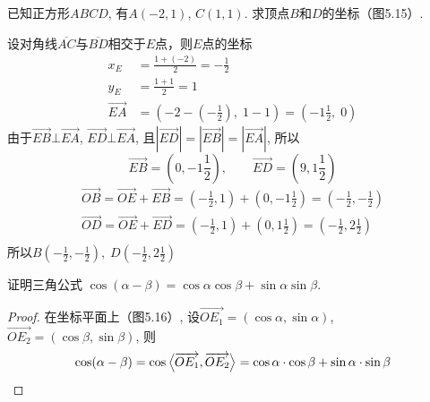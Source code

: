 \begin{example}
    已知正方形$ABCD$, 有$A(-2,1)$, $C(1,1)$. 
求顶点$B$和$D$的坐标（图5.15）.
\end{example}

\begin{solution}
    设对角线$\overline{AC}$与$\overline{BD}$相交于$E$点，则$E$点的坐标
\[\begin{split}
    x_E&=\frac{1+(-2)}{2}=-\frac{1}{2}\\
    y_E&=\frac{1+1}{2}=1\\
    \Vec{EA}&=\left(-2-\left(-\frac{1}{2}\right),\; 1-1\right)=\left(-1\frac{1}{2},\; 0\right)
\end{split}\]
由于$\Vec{EB}\bot \Vec{EA}$, $\Vec{ED}\bot \Vec{EA}$, 
且$|\Vec{ED}|=|\Vec{EB}|=|\Vec{EA}|$, 
所以
\[\Vec{EB}=\left(0,-1\frac{1}{2}\right),\qquad \Vec{ED}=\left(9,1\frac{1}{2}\right)\]
\[\begin{split}
     \Vec{OB}=\Vec{OE}+\Vec{EB}=\left(-\frac{1}{2},1\right)+\left(0,-1\frac{1}{2}\right)=\left(-\frac{1}{2},-\frac{1}{2}\right)\\
     \Vec{OD}=\Vec{OE}+\Vec{ED}=\left(-\frac{1}{2},1\right)+\left(0,1\frac{1}{2}\right)=\left(-\frac{1}{2},2\frac{1}{2}\right)\\
\end{split}\]
所以$B\left(-\frac{1}{2},-\frac{1}{2}\right),\; D\left(-\frac{1}{2},2\frac{1}{2}\right)$
\end{solution}


\begin{example}
    证明三角公式
$\cos(\alpha-\beta) = \cos\alpha\cos\beta+\sin\alpha\sin\beta$.
\end{example}

\begin{figure}[htp]
    \centering
{}
    \caption{}
\end{figure}


\begin{proof}
 在坐标平面上（图5.16）,
设$\Vec{OE_1}=(\cos\alpha,\sin\alpha)$, $\Vec{OE_2}=(\cos\beta,\sin\beta)$, 则
\[\cos(\alpha-\beta)=\cos\left\langle \overrightarrow{OE_1},\overrightarrow{OE_2} \right\rangle=
\cos\alpha\cdot \cos\beta+\sin\alpha\cdot \sin\beta\]   
\end{proof}

